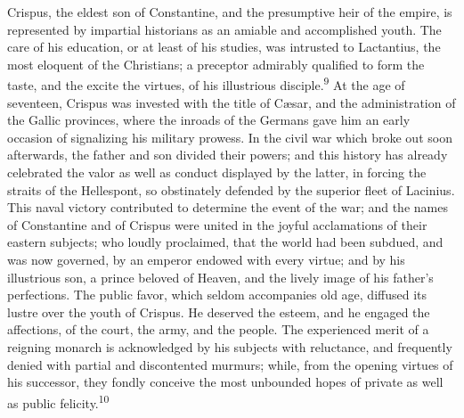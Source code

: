 

Crispus, the eldest son of Constantine, and the presumptive heir
of the empire, is represented by impartial historians as an
amiable and accomplished youth. The care of his education, or at
least of his studies, was intrusted to Lactantius, the most
eloquent of the Christians; a preceptor admirably qualified to
form the taste, and the excite the virtues, of his illustrious
disciple.\textsuperscript{9} At the age of seventeen, Crispus was invested with
the title of Cæsar, and the administration of the Gallic
provinces, where the inroads of the Germans gave him an early
occasion of signalizing his military prowess. In the civil war
which broke out soon afterwards, the father and son divided their
powers; and this history has already celebrated the valor as well
as conduct displayed by the latter, in forcing the straits of the
Hellespont, so obstinately defended by the superior fleet of
Lacinius. This naval victory contributed to determine the event
of the war; and the names of Constantine and of Crispus were
united in the joyful acclamations of their eastern subjects; who
loudly proclaimed, that the world had been subdued, and was now
governed, by an emperor endowed with every virtue; and by his
illustrious son, a prince beloved of Heaven, and the lively image
of his father’s perfections. The public favor, which seldom
accompanies old age, diffused its lustre over the youth of
Crispus. He deserved the esteem, and he engaged the affections,
of the court, the army, and the people. The experienced merit of
a reigning monarch is acknowledged by his subjects with
reluctance, and frequently denied with partial and discontented
murmurs; while, from the opening virtues of his successor, they
fondly conceive the most unbounded hopes of private as well as
public felicity.\textsuperscript{10}


